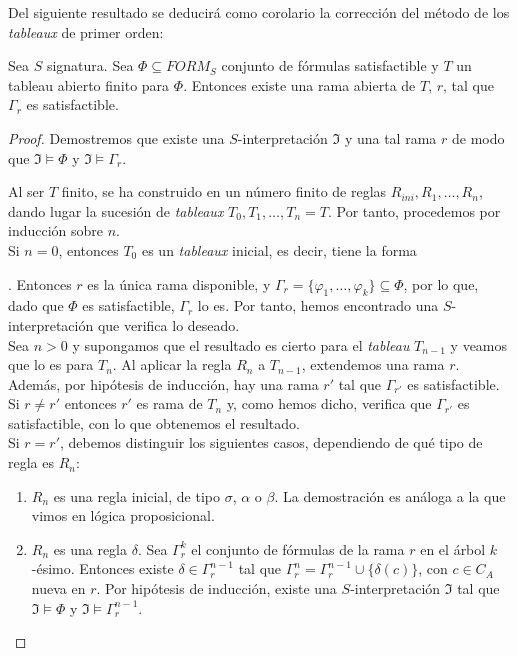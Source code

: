 Del siguiente resultado se deducirá como corolario la corrección del método de los \textit{tableaux} de primer orden:

\begin{theorem}\label{bbb}
Sea $S$ signatura. Sea $\Phi \subseteq FORM_S$ conjunto de fórmulas satisfactible y $T$ un tableau abierto finito para $\Phi$. Entonces existe una rama abierta de $T$, $r$, tal que $\Gamma_r$ es satisfactible.
\end{theorem}
\begin{proof}
Demostremos que existe una $S$-interpretación $\mathfrak{I}$ y una tal rama $r$ de modo que $\mathfrak{I} \vDash \Phi$ y $\mathfrak{I} \vDash \Gamma_r$. 

Al ser $T$ finito, se ha construido en un número finito de reglas $R_{ini}, R_1,  \dots, R_{n}$, dando lugar la sucesión de \textit{tableaux} $T_0, T_1, \dots, T_n = T$. Por tanto, procedemos por inducción sobre $n$. \\

Si $n=0$, entonces $T_0$ es un \textit{tableaux} inicial, es decir, tiene la forma 
.
Entonces $r$ es la única rama disponible, y $\Gamma_r = \{ \varphi_1, \dots, \varphi_k\} \subseteq \Phi$, por lo que, dado que $\Phi$ es satisfactible, $\Gamma_r$ lo es. Por tanto, hemos encontrado una $S$-interpretación que verifica lo deseado. \\

Sea $n>0$ y supongamos que el resultado es cierto para el \textit{tableau} $T_{n-1}$ y veamos que lo es para $T_n$. Al aplicar la regla $R_n$ a $T_{n-1}$, extendemos una rama $r$. Además, por hipótesis de inducción, hay una rama $r'$ tal que $\Gamma_{r'}$ es satisfactible. \\

Si $r \neq r'$ entonces $r'$ es rama de $T_n$ y, como hemos dicho, verifica que $\Gamma_{r'}$ es satisfactible, con lo que obtenemos el resultado. \\

Si $r = r'$, debemos distinguir los siguientes casos, dependiendo de qué tipo de regla es $R_n$:
\begin{enumerate}
    \item $R_n$ es una regla inicial, de tipo $\sigma$, $\alpha$ o $\beta$. La demostración es análoga a la que vimos en lógica proposicional.
    \item $R_n$ es una regla $\delta$. Sea $\Gamma_{r}^{k}$ el conjunto de fórmulas de la rama $r$ en el árbol $k$-ésimo. Entonces existe $\delta \in \Gamma_{r}^{n-1}$ tal que $\Gamma_{r}^{n} = \Gamma_{r}^{n-1} \cup \{\delta(c)\}$, con $c \in C_A$ nueva en $r$. Por hipótesis de inducción, existe una $S$-interpretación $\mathfrak{I}$ tal que $\mathfrak{I} \vDash \Phi$ y $\mathfrak{I} \vDash \Gamma_{r}^{n-1}$.
    

\end{enumerate}
\end{proof}

